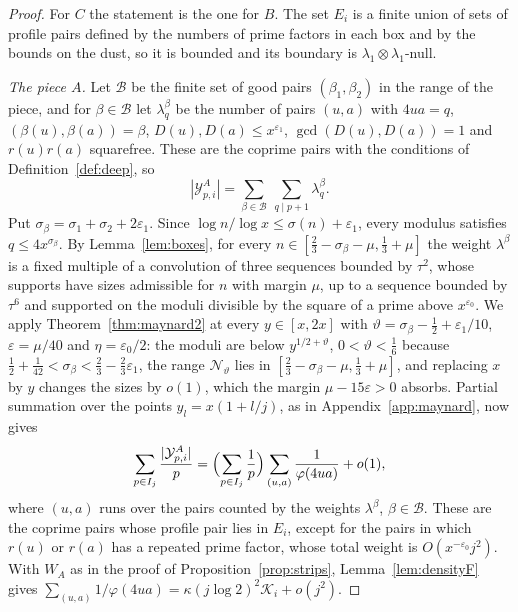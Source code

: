 \documentclass[aps,prd,twocolumn,superscriptaddress,nofootinbib,longbibliography,floatfix,showkeys,nobalancelastpage,amsmath,amssymb,10pt]{revtex4-2}
\theoremstyle{plain}
\theoremstyle{definition}
\theoremstyle{plain}
\newcommand{\eps}{\varepsilon}
\begin{document}
\begin{proof}
For $C$ the statement is the one for $B$. The set $E_i$ is a finite union of sets of profile pairs defined by the numbers of prime factors in each box and by the bounds on the dust, so it is bounded and its boundary is $\lambda_1\otimes\lambda_1$-null.

\emph{The piece $A$.} Let $\mathcal B$ be the finite set of good pairs $(\beta_1,\beta_2)$ in the range of the piece, and for $\beta\in\mathcal B$ let $\lambda^\beta_q$ be the number of pairs $(u,a)$ with $4ua=q$, $(\beta(u),\beta(a))=\beta$, $D(u),D(a)\le x^{\eps_1}$, $\gcd(D(u),D(a))=1$ and $r(u)r(a)$ squarefree. These are the coprime pairs with the conditions of Definition~\ref{def:deep}, so
\[
|\mathcal Y^A_{p,i}|=\sum_{\beta\in\mathcal B}\ \sum_{q\mid p+1}\lambda^\beta_q.
\]
Put $\sigma_\beta=\sigma_1+\sigma_2+2\eps_1$. Since $\log n/\log x\le\sigma(n)+\eps_1$, every modulus satisfies $q\le4x^{\sigma_\beta}$. By Lemma~\ref{lem:boxes}, for every $n\in[\frac23-\sigma_\beta-\mu,\frac13+\mu]$ the weight $\lambda^\beta$ is a fixed multiple of a convolution of three sequences bounded by $\tau^2$, whose supports have sizes admissible for $n$ with margin $\mu$, up to a sequence bounded by $\tau^6$ and supported on the moduli divisible by the square of a prime above $x^{\eps_0}$. We apply Theorem~\ref{thm:maynard2} at every $y\in[x,2x]$ with $\vartheta=\sigma_\beta-\frac12+\eps_1/10$, $\eps=\mu/40$ and $\eta=\eps_0/2$: the moduli are below $y^{1/2+\vartheta}$, $0<\vartheta<\frac16$ because $\frac12+\frac1{42}<\sigma_\beta<\frac23-\frac23\eps_1$, the range $\mathcal N_\vartheta$ lies in $[\frac23-\sigma_\beta-\mu,\frac13+\mu]$, and replacing $x$ by $y$ changes the sizes by $o(1)$, which the margin $\mu-15\eps>0$ absorbs. Partial summation over the points $y_l=x(1+l/j)$, as in Appendix~\ref{app:maynard}, now gives
\[
\sum_{p\in I_j}\frac{|\mathcal Y^A_{p,i}|}p=\Bigl(\sum_{p\in I_j}\frac1p\Bigr)\sum_{(u,a)}\frac1{\varphi(4ua)}+o(1),
\]
where $(u,a)$ runs over the pairs counted by the weights $\lambda^\beta$, $\beta\in\mathcal B$. These are the coprime pairs whose profile pair lies in $E_i$, except for the pairs in which $r(u)$ or $r(a)$ has a repeated prime factor, whose total weight is $O(x^{-\eps_0}j^2)$. With $W_A$ as in the proof of Proposition~\ref{prop:strips}, Lemma~\ref{lem:densityF} gives $\sum_{(u,a)}1/\varphi(4ua)=\kappa(j\log2)^2\mathcal K_i+o(j^2)$.


\end{proof}
\end{document}
